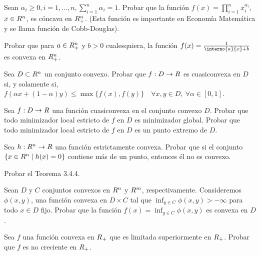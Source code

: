 \begin{exercise}\label{v1:ejer:3.4.5}
 Sean $\alpha_i \ge 0, i=1,\dots,n, \sum_{i=1}^n \alpha_i = 1$. Probar que la función $f(x) = \prod_{i=1}^n x_i^{\alpha_i}$, $x \in R^n$, es cóncava en $R_+^n$. (Esta función es importante en Economía Matemática y se llama función de Cobb-Douglas).
\end{exercise}

\begin{exercise}\label{v1:ejer:3.4.6}
 Probar que para $a \in R_+^n$ y $b > 0$ cualesquiera, la función $f(x) = \frac{1}{\interno{a}{x} + b}$ es convexa en $R_+^n$.
\end{exercise}

\begin{exercise}\label{v1:ejer:3.4.7}
 Sea $D \subset R^n$ un conjunto convexo. Probar que $f: D \to R$ es cuasiconvexa en $D$ si, y solamente si, $f(\alpha x + (1 - \alpha)y) \le \max\{f(x), f(y)\} \quad \forall x, y \in D, \ \forall \alpha \in [0, 1]$.
\end{exercise}

\begin{exercise}\label{v1:ejer:3.4.8}
 Sea $f: D \to R$ una función cuasiconvexa en el conjunto convexo $D$. Probar que todo minimizador local estricto de $f$ en $D$ es minimizador global. Probar que todo minimizador local estricto de $f$ en $D$ es un punto extremo de $D$.
\end{exercise}

\begin{exercise}\label{v1:ejer:3.4.9}
 Sea $h: R^n \to R$ una función estrictamente convexa. Probar que si el conjunto $\{ x \in R^n \mid h(x) = 0 \}$ contiene más de un punto, entonces él no es convexo.
\end{exercise}

\begin{exercise}\label{v1:ejer:3.4.10}
 Probar el Teorema 3.4.4.
\end{exercise}

\begin{exercise}\label{v1:ejer:3.4.11}
 Sean $D$ y $C$ conjuntos convexos en $R^n$ y $R^m$, respectivamente. Consideremos $\phi(x,y)$, una función convexa en $D \times C$ tal que $\inf_{y \in C} \phi(x,y) > -\infty$ para todo $x \in D$ fijo. Probar que la función $f(x) = \inf_{y \in C} \phi(x,y)$ es convexa en $D$.
\end{exercise}

\begin{exercise}\label{v1:ejer:3.4.12}
 Sea $f$ una función convexa en $R_+$ que es limitada superiormente en $R_+$. Probar que $f$ es no creciente en $R_+$.
\end{exercise}

